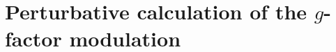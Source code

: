 \documentclass[
  aps,
  reprint,
  amsmath,
  amssymb,
  groupedaddress,
  floatfix,
  longbibliography,
]{revtex4-2}
\begin{document}


\appendix




\section{Perturbative calculation of the $g$-factor modulation}
\label{app:perturbation}
\end{document}
